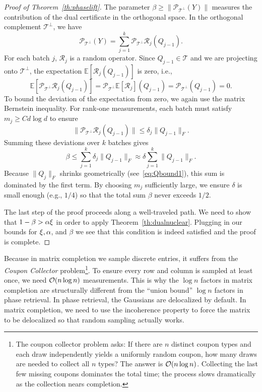 \begin{proof}[Proof of Theorem~\ref{th:phaselift}]
The parameter $\beta \ge \|\mathcal{P}_{\mathcal{T}^\perp}(Y)\|$ measures the contribution of the dual certificate in the orthogonal space.  In the orthogonal complement $\mathcal{T}^\perp$, we have
$$\mathcal{P}_{\mathcal{T}^\perp}(Y) = \sum_{j=1}^k \mathcal{P}_{\mathcal{T}^\perp} \mathcal{R}_j(Q_{j-1}).$$
For each batch $j$, $\mathcal{R}_j$ is a random operator. Since $Q_{j-1} \in \mathcal{T}$ and we are projecting onto $\mathcal{T}^\perp$, the expectation $\mathbb{E}[\mathcal{R}_j(Q_{j-1})]$ is zero, i.e.,
$$\mathbb{E}[\mathcal{P}_{\mathcal{T}^\perp} \mathcal{R}_j(Q_{j-1})] = \mathcal{P}_{\mathcal{T}^\perp} \mathbb{E}[\mathcal{R}_j](Q_{j-1}) = \mathcal{P}_{\mathcal{T}^\perp} (Q_{j-1}) = 0.$$
To bound the deviation of the expectation from zero, we again use the matrix Bernstein inequality. For rank-one measurements, each batch must satisfy $m_j \ge C d \log d$ to ensure
$$\|\mathcal{P}_{\mathcal{T}^\perp} \mathcal{R}_j(Q_{j-1})\| \le \delta_j \|Q_{j-1}\|_F.$$
Summing these deviations over $k$ batches gives
$$\beta \le \sum_{j=1}^k \delta_j \|Q_{j-1}\|_F \approx \delta \sum_{j=1}^k  \|Q_{j-1}\|_F .$$
Because $\|Q_j\|_F$ shrinks geometrically (see~\eqref{eq:Qbound1}), this sum is dominated by the first term. By choosing $m_j$ sufficiently large, we ensure $\delta$ is small enough (e.g., $1/4$) so that the total sum $\beta$ never exceeds $1/2$.




The last step of the proof proceeds along a well-traveled path. We need to show that $1-\beta > \alpha \xi$ in order to apply Theorem~\ref{th:dualnuclear}. Plugging in our bounds for $\xi, \alpha$, and $\beta$ we see that this condition is indeed satisfied and the proof is complete.
    
\end{proof}

\begin{remark}
Because in matrix completion we sample discrete entries, it suffers from the {\em Coupon Collector} problem\footnote{The coupon collector problem asks:
If there are $n$ distinct coupon types and each draw independently yields a uniformly random coupon, how many draws are needed to collect all $n$ types?
The answer is $\mathcal{O}(n \log n)$. Collecting the last few missing coupons dominates the total time; the process slows dramatically as the collection nears completion.}.
To ensure every row and column is sampled at least once, we need $\mathcal{O}(n \log n)$ measurements. This is why the $\log n$ factors in matrix completion are structurally different from the ``union bound'' $\log n$ factors in phase retrieval. In phase retrieval, the Gaussians are delocalized by default. In matrix completion, we need to use the incoherence property to force the matrix to be delocalized so that random sampling actually works.   
\end{remark}




